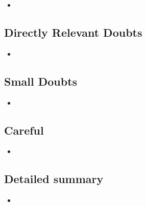 \documentclass{article}
\begin{document}
    \begin{itemize}

    \item 
    
    \end{itemize}

\subsection*{Directly Relevant Doubts}

    \begin{itemize}

    \item{}
    
    \end{itemize}
    
\subsection*{Small Doubts}

    \begin{itemize}

    \item 
    
    \end{itemize}

\subsection*{Careful}

    \begin{itemize}

    \item 
    
    \end{itemize}


\subsection*{Detailed summary}

    \begin{itemize}

    \item 
    
    \end{itemize}
\end{document}
